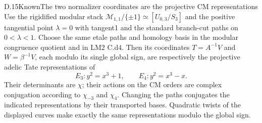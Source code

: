 \begin{statement}{D.15}{Known}{The two normalizer coordinates are the projective CM representations}
Use the rigidified modular stack $\mathcal M_{1,1}/\{\pm1\}\simeq[U_{0,3}/S_3]$ and the positive tangential point $\lambda=0$ with tangent1 and the standard branch-cut paths on $0<\lambda<1$. Choose the same etale paths and homology basis in the modular congruence quotient and in LM2 C.d4. Then its coordinates
$T=A^{-1}V$ and $W=\beta^{-1}V$, each modulo its single global sign, are respectively the projective adelic Tate representations of
\[
 E_3:y^2=x^3+1,\qquad E_4:y^2=x^3-x.                       \tag{D.13}
\]
Their determinants are $\chi$; their actions on the CM orders are complex conjugation according to $\chi_{-3}$ and $\chi_4$. Changing the paths conjugates the indicated representations by their transported bases. Quadratic twists of the displayed curves make exactly the same representations modulo the global sign.
\end{statement}
